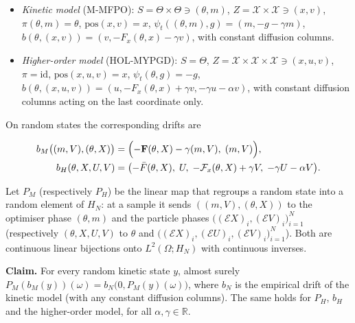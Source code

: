 \documentclass[11pt,a4paper]{report}
\begin{document}
\begin{itemize}


\item \emph{Kinetic model} (M-MFPO): \(S=\Theta\times\Theta\ni(\theta,m)\), \(Z=\mathcal X\times\mathcal X\ni(x,v)\), \(\pi(\theta,m)=\theta\), \(\mathrm{pos}(x,v)=x\), \(\psi_t((\theta,m),g)=(m,-g-\gamma m)\), \(b(\theta,(x,v))=(v,-F_x(\theta,x)-\gamma v)\), with constant diffusion columns.

\item \emph{Higher-order model} (HOL-MYPGD): \(S=\Theta\), \(Z=\mathcal X\times\mathcal X\times\mathcal X\ni(x,u,v)\), \(\pi=\mathrm{id}\), \(\mathrm{pos}(x,u,v)=x\), \(\psi_t(\theta,g)=-g\), \(b(\theta,(x,u,v))=(u,-F_x(\theta,x)+\gamma v,-\gamma u-\alpha v)\), with constant diffusion columns acting on the last coordinate only.

\end{itemize}



On random states the corresponding drifts are


\[\begin{aligned}b_M\bigl((m,V),(\theta,X)\bigr)&=\Bigl(-\mathbf F(\theta,X)-\gamma(m,V),\;(m,V)\Bigr),\\ b_H(\theta,X,U,V)&=\bigl(-\bar F(\theta,X),\;U,\;-\mathcal F_x(\theta,X)+\gamma V,\;-\gamma U-\alpha V\bigr).\end{aligned}\]


Let \(P_M\) (respectively \(P_H\)) be the linear map that regroups a random state into a random element of \(H_N\): at a sample it sends \(((m,V),(\theta,X))\) to the optimiser phase \((\theta,m)\) and the particle phases \(\bigl((\mathcal EX)_i,(\mathcal EV)_i\bigr)_{i=1}^N\) (respectively \((\theta,X,U,V)\) to \(\theta\) and \(\bigl((\mathcal EX)_i,(\mathcal EU)_i,(\mathcal EV)_i\bigr)_{i=1}^N\)). Both are continuous linear bijections onto \(L^2(\Omega;H_N)\) with continuous inverses.




\textbf{Claim.} For every random kinetic state \(y\), almost surely \(P_M(b_M(y))(\omega)=b_N\bigl(0,P_M(y)(\omega)\bigr)\), where \(b_N\) is the empirical drift of the kinetic model (with any constant diffusion columns). The same holds for \(P_H\), \(b_H\) and the higher-order model, for all \(\alpha,\gamma\in\mathbb R\).
\end{document}
